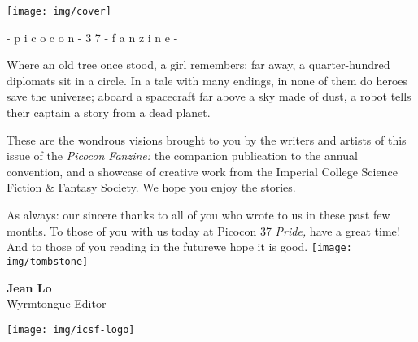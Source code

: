 \documentclass{picocon-fanzine}
\renewcommand{\tombstone}{%
  \texttt{[image: img/tombstone]}%
}
\begin{document}
\thispagestyle{empty}
\texttt{[image: img/cover]}
\vfill
\begin{center}{\color{gray}- p i c o c o n - 3 7 - f a n z i n e -}\end{center}
\clearpage


Where an old tree once stood, a girl remembers; far away, a
quarter-hundred diplomats sit in a circle. In a tale with many
endings, in none of them do heroes save the universe; aboard a
spacecraft far above a sky made of dust, a robot tells their captain a
story from a dead planet.

These are the wondrous visions brought to you by the writers and
artists of this issue of the \textit{Picocon Fanzine:} the companion
publication to the annual convention, and a showcase of creative work
from the Imperial College Science Fiction \& Fantasy Society. We hope
you enjoy the stories.

As always: our sincere thanks to all of you who wrote to us in these
past few months. To those of you with us today at Picocon 37
\textit{Pride,} have a great time! And to those of you reading in the
future\textemdash we hope it is good. \tombstone{}

\hfill \parbox{0.5\textwidth}{{\large\textbf{Jean Lo}}\\Wyrmtongue
  Editor}
\vfill
\tableofcontents
\vfill

\clearpage
{}


\clearpage
{}

\clearpage
{}


\clearpage
{}

\vfill
\begin{center}
  \texttt{[image: img/icsf-logo]}
\end{center}
\vspace{4em}
\end{document}
